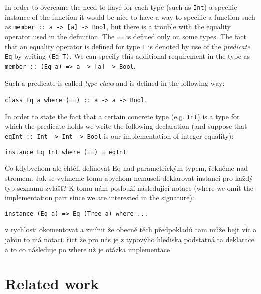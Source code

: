 \documentclass[11pt]{article}
\newcommand{\red}[1]{{\color{red} #1}}
\begin{document}
\begin{article}
In order to overcame the need to have for each type (such as \texttt{Int}) a specific instance of the function it would be nice to have a way to specific 
a function such as \texttt{member :: a -> [a] -> Bool}, but there is a trouble with
the equality operator used in the definition. The \texttt{==} is defined only on some types. 
The fact that an equality operator is defined for type \texttt{T} is denoted by use of the \textit{predicate} \texttt{Eq} by writing \texttt{(Eq T)}.  
We can specify this additional requirement in the type as \texttt{member :: (Eq a) => a -> [a] -> Bool}. 

Such a predicate is called \textit{type class} and is defined in the following way:

\texttt{class Eq a where (==) :: a -> a -> Bool}.

In order to state the fact that a certain concrete type (e.g. \texttt{Int}) is a type for which the predicate holds we write the following declaration (and suppose that \texttt{eqInt :: Int -> Int -> Bool} is our implementation of integer equality):

\texttt{instance Eq Int where (==) = eqInt}

\red{Co kdybychom ale chtěli definovat Eq nad parametrickým typem, řekněme nad stromem. Jak se vyhneme tomu abychom nemuseli deklarovat instanci pro každý typ seznamu zvlášť? K tomu nám poslouží následující notace (where we omit the implementation part since we are interested in the signature):}

\texttt{instance (Eq a) => Eq (Tree a) where ...}



\red{v rychlosti okomentovat a zmínit že obecně těch předpokladů tam může bejt víc a jakou to má notaci. řict že pro nás je z typovýho hlediska podstatná ta deklarace a to co následuje po where už je otázka implementace }



\section{Related work}
\label{related}


\end{article}
\end{document}
